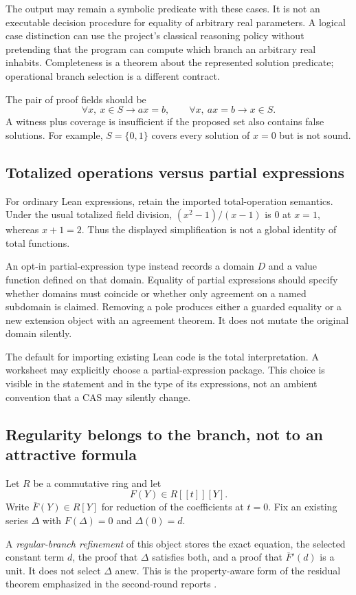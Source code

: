 \documentclass[11pt,a4paper]{article}
\theoremstyle{plain}
\theoremstyle{definition}
\begin{document}
The output may remain a symbolic predicate with these cases. It is not an executable decision procedure for equality of arbitrary real parameters. A logical case distinction can use the project's classical reasoning policy without pretending that the program can compute which branch an arbitrary real inhabits. Completeness is a theorem about the represented solution predicate; operational branch selection is a different contract.

The pair of proof fields should be
\[
 \forall x,\ x\in S\to ax=b,
 \qquad
 \forall x,\ ax=b\to x\in S.
\]
A witness plus coverage is insufficient if the proposed set also contains false solutions. For example, $S=\{0,1\}$ covers every solution of $x=0$ but is not sound.

\subsection{Totalized operations versus partial expressions}
For ordinary Lean expressions, retain the imported total-operation semantics. Under the usual totalized field division, $(x^2-1)/(x-1)$ is $0$ at $x=1$, whereas $x+1=2$. Thus the displayed simplification is not a global identity of total functions.

An opt-in partial-expression type instead records a domain $D$ and a value function defined on that domain. Equality of partial expressions should specify whether domains must coincide or whether only agreement on a named subdomain is claimed. Removing a pole produces either a guarded equality or a new extension object with an agreement theorem. It does not mutate the original domain silently.

The default for importing existing Lean code is the total interpretation. A worksheet may explicitly choose a partial-expression package. This choice is visible in the statement and in the type of its expressions, not an ambient convention that a CAS may silently change.

\subsection{Regularity belongs to the branch, not to an attractive formula}
Let $R$ be a commutative ring and let
\[
 F(Y)\in R[[t]][Y].
\]
Write $\overline F(Y)\in R[Y]$ for reduction of the coefficients at $t=0$. Fix an existing series $\Delta$ with $F(\Delta)=0$ and $\Delta(0)=d$.

A \emph{regular-branch refinement} of this object stores the exact equation, the selected constant term $d$, the proof that $\Delta$ satisfies both, and a proof that $\overline F'(d)$ is a unit. It does not select $\Delta$ anew. This is the property-aware form of the residual theorem emphasized in the second-round reports \cite{synA,synB}.
\end{document}
